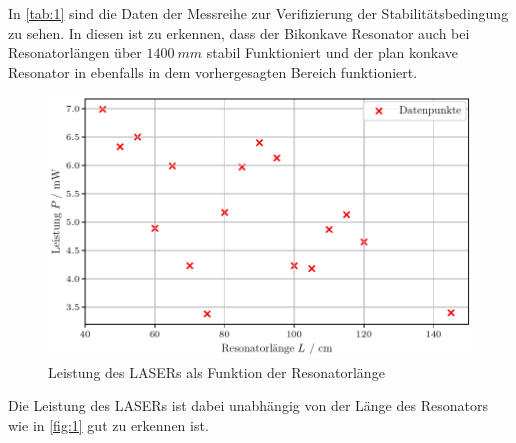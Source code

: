 \noindent
In \autoref{tab:1} sind die Daten der Messreihe zur Verifizierung der Stabilitätsbedingung zu sehen. In diesen ist zu erkennen, dass der Bikonkave Resonator auch bei Resonatorlängen über $\SI{1400}{mm}$ stabil Funktioniert und der plan konkave Resonator in ebenfalls in dem vorhergesagten Bereich funktioniert. 
\begin{figure}[H]
  \centering
  \includegraphics[width=0.55\linewidth]{plots/stab_bed_1.pdf}
  \caption{Leistung des LASERs als Funktion der Resonatorlänge}
  \label{fig:1}
\end{figure}
\noindent
Die Leistung des LASERs ist dabei unabhängig von der Länge des Resonators wie in \autoref{fig:1} gut zu erkennen ist.
\newpage
